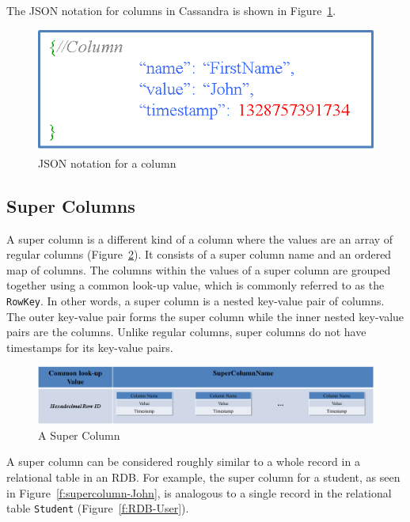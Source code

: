 The JSON notation for  columns in Cassandra is shown in Figure~\ref{f:column-JSON}. 

\begin{figure}[H]
	\centering
	\includegraphics[width=.5\textwidth]{./figure/Example/Column_JSON.png}
	\caption{JSON notation for a column}\label{f:column-JSON}
\end{figure}
% 
\subsection{Super Columns}
A super column is a different kind of a column where the
values are an array of regular columns (Figure~\ref{f:supercolumn}).  It consists of a super
column name and an ordered map of columns.  The columns within the values of a
super column are grouped together using a common look-up value,   which is
commonly referred to as the \texttt{RowKey}.  In other words,   a super column is a
nested key-value pair of columns.  The outer key-value pair forms the super column while the inner
nested key-value pairs are the columns.  Unlike regular columns,   super columns do
not have timestamps for its key-value pairs.  

\begin{figure}[H]
	\centering
	\includegraphics[width=\textwidth]{./figure/Example/SuperColumn.png}
	\caption{A Super Column }\label{f:supercolumn}
\end{figure}

A super column can be considered roughly similar to a whole record in a
relational table in an \ac{RDB}. For example,   the super column for a
student,   as seen in Figure~\ref{f:supercolumn-John},   is analogous to a single
record in the relational table \texttt{Student} (Figure~\ref{f:RDB-User}). 

